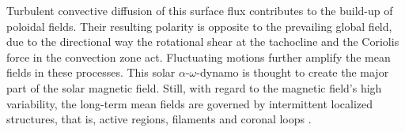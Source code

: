 Turbulent convective diffusion of this surface flux contributes to the build-up of poloidal fields. Their resulting polarity is opposite to the prevailing global field, due to the directional way the rotational shear at the tachocline and the Coriolis force in the convection zone act. Fluctuating motions further amplify the mean fields in these processes. This solar $\alpha$-$\omega$-dynamo is thought to create the major part of the solar magnetic field. Still, with regard to the magnetic field's high variability, the long-term mean fields are governed by intermittent localized structures, that is, active regions, filaments and coronal loops \citep{Miesch2005}.	%




